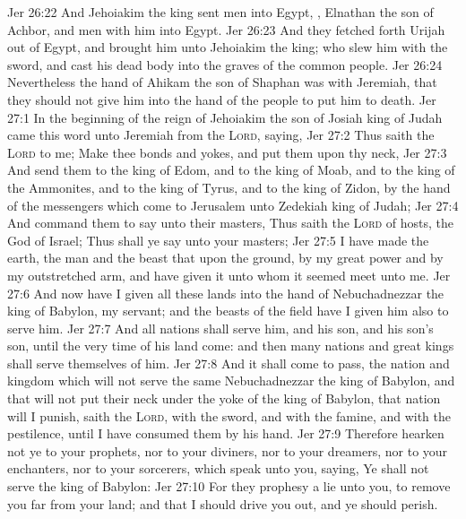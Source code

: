 \vs Jer 26:22 And Jehoiakim the king sent men into Egypt, , Elnathan the son of Achbor, and  men with him into Egypt.
\vs Jer 26:23 And they fetched forth Urijah out of Egypt, and brought him unto Jehoiakim the king; who slew him with the sword, and cast his dead body into the graves of the common people.
\vs Jer 26:24 Nevertheless the hand of Ahikam the son of Shaphan was with Jeremiah, that they should not give him into the hand of the people to put him to death.
\vs Jer 27:1 In the beginning of the reign of Jehoiakim the son of Josiah king of Judah came this word unto Jeremiah from the \textsc{Lord}, saying,
\vs Jer 27:2 Thus saith the \textsc{Lord} to me; Make thee bonds and yokes, and put them upon thy neck,
\vs Jer 27:3 And send them to the king of Edom, and to the king of Moab, and to the king of the Ammonites, and to the king of Tyrus, and to the king of Zidon, by the hand of the messengers which come to Jerusalem unto Zedekiah king of Judah;
\vs Jer 27:4 And command them to say unto their masters, Thus saith the \textsc{Lord} of hosts, the God of Israel; Thus shall ye say unto your masters;
\vs Jer 27:5 I have made the earth, the man and the beast that  upon the ground, by my great power and by my outstretched arm, and have given it unto whom it seemed meet unto me.
\vs Jer 27:6 And now have I given all these lands into the hand of Nebuchadnezzar the king of Babylon, my servant; and the beasts of the field have I given him also to serve him.
\vs Jer 27:7 And all nations shall serve him, and his son, and his son's son, until the very time of his land come: and then many nations and great kings shall serve themselves of him.
\vs Jer 27:8 And it shall come to pass,  the nation and kingdom which will not serve the same Nebuchadnezzar the king of Babylon, and that will not put their neck under the yoke of the king of Babylon, that nation will I punish, saith the \textsc{Lord}, with the sword, and with the famine, and with the pestilence, until I have consumed them by his hand.
\vs Jer 27:9 Therefore hearken not ye to your prophets, nor to your diviners, nor to your dreamers, nor to your enchanters, nor to your sorcerers, which speak unto you, saying, Ye shall not serve the king of Babylon:
\vs Jer 27:10 For they prophesy a lie unto you, to remove you far from your land; and that I should drive you out, and ye should perish.
